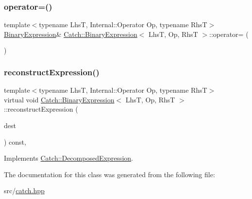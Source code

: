 \mbox{\label{class_catch_1_1_binary_expression_a2147a858eb5866e5643d0ef321064aa1}} 
\subsubsection{\texorpdfstring{operator=()}{operator=()}}
{\footnotesize\ttfamily template$<$typename LhsT, Internal\+::\+Operator Op, typename RhsT$>$ \\
\hyperlink{class_catch_1_1_binary_expression}{Binary\+Expression}\& \hyperlink{class_catch_1_1_binary_expression}{Catch\+::\+Binary\+Expression}$<$ LhsT, Op, RhsT $>$\+::operator= (\begin{DoxyParamCaption}\item[{\hyperlink{class_catch_1_1_binary_expression}{Binary\+Expression}$<$ LhsT, Op, RhsT $>$ \&}]{ }\end{DoxyParamCaption})}

\mbox{\label{class_catch_1_1_binary_expression_a6ed73ff9af9c229f9fa3d35d019f9e37}} 
\subsubsection{\texorpdfstring{reconstruct\+Expression()}{reconstructExpression()}}
{\footnotesize\ttfamily template$<$typename LhsT, Internal\+::\+Operator Op, typename RhsT$>$ \\
virtual void \hyperlink{class_catch_1_1_binary_expression}{Catch\+::\+Binary\+Expression}$<$ LhsT, Op, RhsT $>$\+::reconstruct\+Expression (\begin{DoxyParamCaption}\item[{\textbf{ std\+::string} \&}]{dest }\end{DoxyParamCaption}) const\hspace{0.3cm}{\ttfamily [inline]}, {\ttfamily [virtual]}}



Implements \hyperlink{struct_catch_1_1_decomposed_expression_a9ce7f356dc96f11f80e40c82f5aa7e55}{Catch\+::\+Decomposed\+Expression}.



The documentation for this class was generated from the following file\+:\begin{DoxyCompactItemize}
\item 
src/\hyperlink{catch_8hpp}{catch.\+hpp}\end{DoxyCompactItemize}
